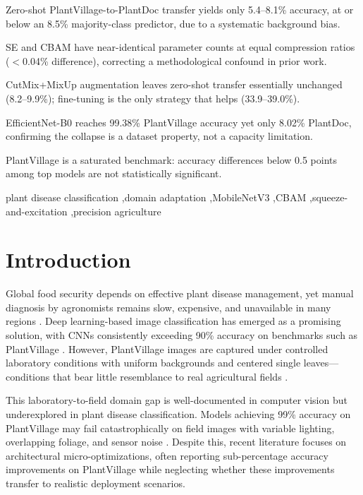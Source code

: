 \documentclass[preprint,12pt]{elsarticle}
\begin{document}
\begin{frontmatter}
\begin{highlights}
\item Zero-shot PlantVillage-to-PlantDoc transfer yields only 5.4--8.1\% accuracy, at or below an 8.5\% majority-class predictor, due to a systematic background bias.
\item SE and CBAM have near-identical parameter counts at equal compression ratios ($<$0.04\% difference), correcting a methodological confound in prior work.
\item CutMix+MixUp augmentation leaves zero-shot transfer essentially unchanged (8.2--9.9\%); fine-tuning is the only strategy that helps (33.9--39.0\%).
\item EfficientNet-B0 reaches 99.38\% PlantVillage accuracy yet only 8.02\% PlantDoc, confirming the collapse is a dataset property, not a capacity limitation.
\item PlantVillage is a saturated benchmark: accuracy differences below 0.5 points among top models are not statistically significant.
\end{highlights}



\begin{keyword}
plant disease classification \sep domain adaptation \sep MobileNetV3 \sep CBAM \sep squeeze-and-excitation \sep precision agriculture
\end{keyword}

\end{frontmatter}

\section{Introduction}
\label{sec:intro}

Global food security depends on effective plant disease management, yet manual diagnosis by agronomists remains slow, expensive, and unavailable in many regions \cite{Sajitha2024, Wang2024}. Deep learning-based image classification has emerged as a promising solution, with CNNs consistently exceeding 90\% accuracy on benchmarks such as PlantVillage \cite{Mohanty2016, Vishnoi2023, Pandian2022, Syed-Ab-Rahman2022}. However, PlantVillage images are captured under controlled laboratory conditions with uniform backgrounds and centered single leaves—conditions that bear little resemblance to real agricultural fields \cite{Pandian2022, Liu2023}.

This laboratory-to-field domain gap is well-documented in computer vision but underexplored in plant disease classification. Models achieving 99\% accuracy on PlantVillage may fail catastrophically on field images with variable lighting, overlapping foliage, and sensor noise \cite{Lu2025}. Despite this, recent literature focuses on architectural micro-optimizations, often reporting sub-percentage accuracy improvements on PlantVillage while neglecting whether these improvements transfer to realistic deployment scenarios.
\end{document}
